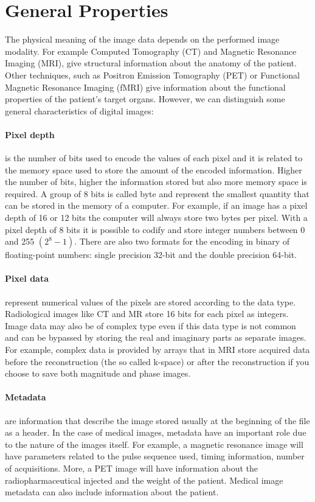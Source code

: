 \documentclass{standalone}
\begin{document}
\section{General Properties}
The physical meaning of the image data depends on the performed image modality.
For example Computed Tomography (CT) and Magnetic Resonance Imaging (MRI), give structural information about the anatomy of the patient.
Other techniques, such as Positron Emission Tomography (PET) or Functional Magnetic Resonance Imaging (fMRI) give information about the functional properties of the patient's target organs. 
However, we can distinguish some general characteristics of digital images:

\paragraph{Pixel depth} is the number of bits used to encode the values of each pixel and it is related to the memory space used to store the amount of the encoded information\cite{Larobina}. 
Higher the number of bits, higher the information stored but also more memory space is required\cite{Larobina}. 
A group of 8 bits is called byte and represent the smallest quantity that can be stored in the memory of a computer.
For example, if an image has a pixel depth of 16 or 12 bits the computer will always store two bytes per pixel\cite{Larobina}.
With a pixel depth of 8 bits it is possible to codify and store integer numbers between 0 and 255 $(2^8-1)$.
There are also two formats for the encoding in binary of floating-point numbers: single precision 32-bit and the double precision 64-bit.

\paragraph{Pixel data} represent numerical values of the pixels are stored according to the data type.
Radiological images like CT and MR store 16 bits for each pixel as integers.
Image data may also be of complex type even if this data type is not common and can be bypassed by storing the real and imaginary parts as separate images.
For example, complex data is provided by arrays that in MRI store acquired data before the reconstruction (the so called k-space) or after the reconstruction if you choose to save both magnitude and phase images\cite{Larobina}.


\paragraph{Metadata} are information that describe the image stored usually at the beginning of the file as a header\cite{Larobina}. 
In the case of medical images, metadata have an important role due to the nature of the images itself.
For example, a magnetic resonance image will have parameters related to the pulse sequence used, timing information, number of acquisitions.
More, a PET image will have information about the radiopharmaceutical injected and the weight of the patient.
Medical image metadata can also include information about the patient.
\end{document}
